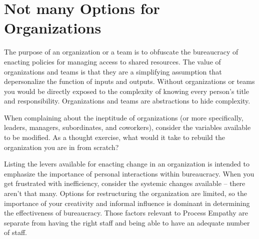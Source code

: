 \section{Not many Options for Organizations}

The purpose of an organization or a team is to obfuscate the bureaucracy of enacting policies for managing access to shared resources. The value of organizations and teams is that they are a simplifying assumption that depersonalize the function of inputs and outputs. Without organizations or teams you would be directly exposed to the complexity of knowing every person's title and responsibility. Organizations and teams are abstractions to hide complexity.

When complaining about the ineptitude of organizations (or more specifically, leaders, managers, subordinates, and coworkers), consider the variables available to be modified. As a thought exercise, what would it take to rebuild the organization you are in from scratch? 

Listing the levers available for enacting change in an organization is intended to emphasize the importance of personal interactions within bureaucracy. When you get frustrated with inefficiency, consider the systemic changes available -- there aren't that many. Options for restructuring the organization are limited, so the importance of your creativity and informal influence is dominant in determining the effectiveness of bureaucracy. Those factors relevant to Process Empathy are separate from having the right staff and being able to have an adequate number of staff. 


